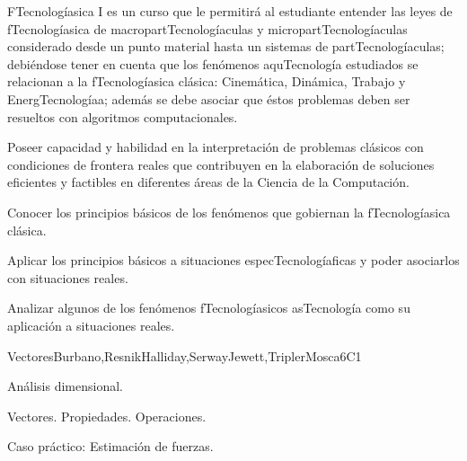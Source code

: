 \begin{syllabus}


\begin{justification}
FTecnologíasica I es un curso que le permitirá al estudiante entender
las leyes de fTecnologíasica de macropartTecnologíaculas y micropartTecnologíaculas considerado desde un
punto material hasta un sistemas de partTecnologíaculas; debiéndose tener en cuenta que los
fenómenos aquTecnología estudiados se relacionan a la fTecnologíasica clásica: Cinemática, Dinámica, Trabajo y EnergTecnologíaa; 
además se debe asociar que éstos problemas deben ser resueltos con algoritmos computacionales.

Poseer capacidad y habilidad en la interpretación de problemas clásicos
con condiciones de frontera reales que contribuyen en la elaboración de soluciones eficientes
y factibles en diferentes áreas de la Ciencia de la Computación.
\end{justification}

\begin{goals}
\item Conocer los principios básicos de los fenómenos que gobiernan la fTecnologíasica clásica.
\item Aplicar los principios básicos a situaciones especTecnologíaficas y poder asociarlos con situaciones reales.
\item Analizar algunos de los fenómenos fTecnologíasicos asTecnología como su aplicación a situaciones reales.
\end{goals}

\begin{outcomes}
  \item {}
  \item {}
  \item {}
\end{outcomes}

\begin{competences}
  \item {} 
  \item {}
  \item {}
\end{competences}

\begin{unit}{}{Vectores}{Burbano,ResnikHalliday,SerwayJewett,TriplerMosca}{6}{C1}
\begin{topics}
      \item Análisis dimensional.
      \item Vectores. Propiedades. Operaciones.
      \item Caso práctico: Estimación de fuerzas.
   \end{topics}


\end{unit}
\end{syllabus}
